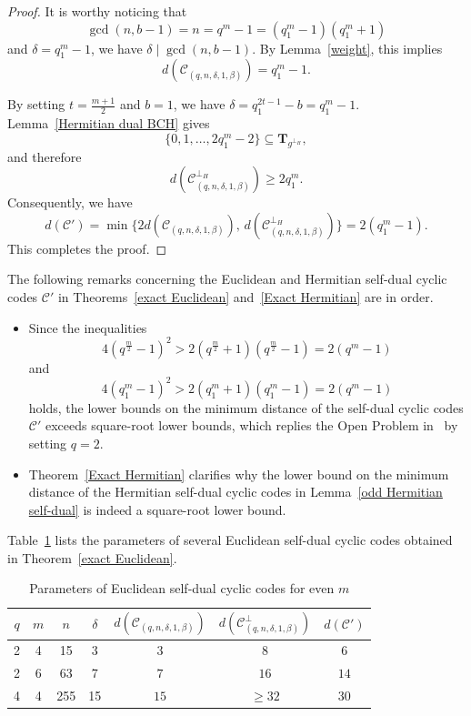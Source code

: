 \documentclass[journal,12pt,onecolumn]{IEEEtran}
\begin{document}
\begin{proof}
It is worthy noticing that
\[
\gcd(n, b-1) = n = q^m - 1 = (q_1^m - 1)(q_1^m + 1)
\]
and $\delta = q_1^m - 1$, we have $\delta \mid \gcd(n, b-1)$. By Lemma~\ref{weight}, this implies
\[
d(\mathcal{C}_{(q,n,\delta,1,\beta)}) = q_1^m - 1.
\]

By setting $t = \frac{m+1}{2}$ and $b = 1$, we have $\delta = q_1^{2t-1} - b = q_1^m - 1$. Lemma~\ref{Hermitian dual BCH} gives
\[
\{0,1,\dots,2q_1^m - 2\} \subseteq \mathbf{T}_{g^{\perp_H}},
\]
and therefore
\[
d(\mathcal{C}^{\perp_H}_{(q,n,\delta,1,\beta)}) \ge 2q_1^m.
\]
Consequently, we have
\[
d(\mathcal{C}') = \min\{2d(\mathcal{C}_{(q,n,\delta,1,\beta)}),\, d(\mathcal{C}^{\perp_H}_{(q,n,\delta,1,\beta)})\}
= 2(q_1^m - 1).
\]
This completes the proof.
\end{proof}

The following remarks concerning the Euclidean and Hermitian self-dual cyclic codes $\mathcal{C}'$ in Theorems~\ref{exact Euclidean} and~\ref{Exact Hermitian} are in order.

\begin{itemize}
    \item Since the inequalities 
    \[
    4(q^{\frac{m}{2}} - 1)^2 > 2(q^{\frac{m}{2}} + 1)(q^{\frac{m}{2}} - 1) = 2(q^m - 1)
    \]
    and
    \[
    4(q_1^m - 1)^2 > 2(q_1^m + 1)(q_1^m - 1) = 2(q^m - 1)
    \]
    holds, the lower bounds on the minimum distance of the self-dual cyclic codes $\mathcal{C}'$ exceeds square-root lower bounds, which replies the Open Problem in~\cite{10856234} by setting $q=2$.

    \item Theorem~\ref{Exact Hermitian} clarifies why the lower bound on the minimum distance of the Hermitian self-dual cyclic codes in Lemma~\ref{odd Hermitian self-dual} is indeed a square-root lower bound.
\end{itemize}

Table~\ref{even} lists the parameters of several Euclidean self-dual cyclic codes obtained in Theorem~\ref{exact Euclidean}.

\begin{table}[htbp]
  \centering
  \caption{Parameters of Euclidean self-dual cyclic codes for even $m$}
  \label{even}
  \begin{tabular}{|c|c|c|c|c|c|c|}
    \hline
    $q$ & $m$ & $n$ & $\delta$ & $d(\mathcal{C}_{(q,n,\delta,1,\beta)})$ & $d(\mathcal{C}_{(q,n,\delta,1,\beta)}^\perp)$ & $d(\mathcal{C}')$ \\
    \hline
    2 & 4 & 15 & 3 & $3$ & $8$ & $6$ \\
    \hline
    2 & 6 & 63 & 7 & $7$ & $16$ & $14$ \\
    \hline
    4 & 4 & 255 & 15 & $15$ & $\ge32$ & $30$ \\
    \hline
  \end{tabular}
\end{table}
\end{document}
